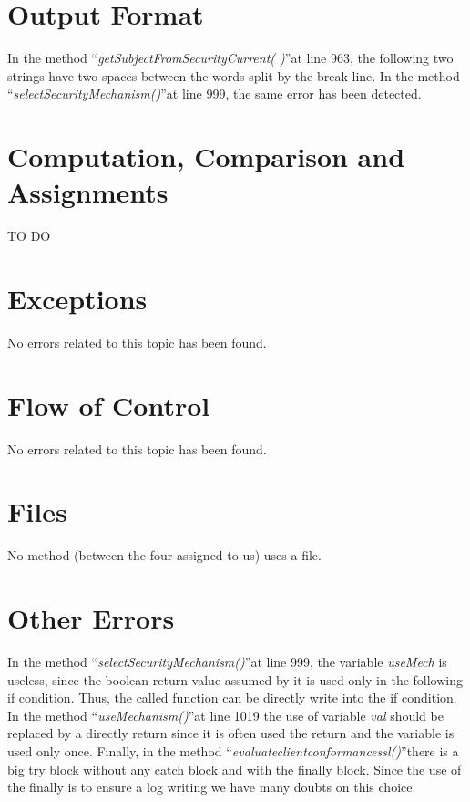 \documentclass[\mainpath/main]{subfiles}
\begin{document}
\section{Output Format}
\label{CodeInspectionChecklist:OutputFormat}
In the method \textquotedblleft \textit{getSubjectFromSecurityCurrent( )}\textquotedblright at line 963, the following two strings have two spaces between the words split by the break-line.
In the method \textquotedblleft \textit{selectSecurityMechanism(\textellipsis)}\textquotedblright at line 999, the same error has been detected.

\section{Computation, Comparison and Assignments}
\label{CodeInspectionChecklist:ComputationComparisonandAssignments}
TO DO

\section{Exceptions}
\label{CodeInspectionChecklist:Exceptions}
No errors related to this topic has been found.

\section{Flow of Control}
\label{CodeInspectionChecklist:FlowofControl}
No errors related to this topic has been found.

\section{Files}
\label{CodeInspectionChecklist:Files}
No method (between the four assigned to us) uses a file.

\section{Other Errors}
\label{CodeInspectionChecklist:OtherErrors}
In the method \textquotedblleft \textit{selectSecurityMechanism(\textellipsis)}\textquotedblright at line 999, the variable \textit{useMech} is useless, since the boolean return value assumed by it is used only in the following if condition. Thus, the called function can be directly write into the if condition.
In the method \textquotedblleft \textit{useMechanism(\textellipsis)}\textquotedblright at line 1019 the use of variable \textit{val} should be replaced by a directly return since it is often used the return and the variable is used only once.
Finally, in the method \textquotedblleft \textit{evaluate\textunderscore client\textunderscore conformance\textunderscore ssl(\textellipsis)}\textquotedblright there is a big try block without any catch block and with the finally block. Since the use of the finally is to ensure a log writing we have many doubts on this choice.
\end{document}
